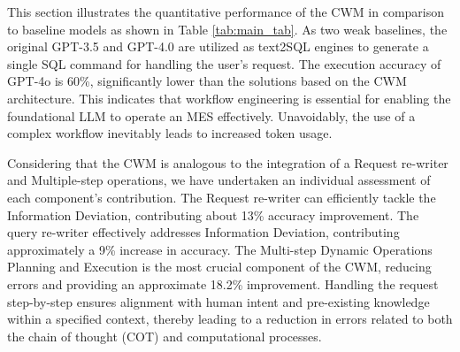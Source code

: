 \documentclass[preprint,12pt]{elsarticle}
\begin{document}
This section illustrates the quantitative performance of the CWM in comparison to baseline models as shown in Table \ref{tab:main_tab}.%
As two weak baselines, the original GPT-3.5 and GPT-4.0 are utilized as text2SQL engines to generate a single SQL command for handling the user's request.
The execution accuracy of GPT-4o is 60\%, significantly lower than the solutions based on the CWM architecture. 
This indicates that workflow engineering is essential for enabling the foundational LLM to operate an MES effectively.
Unavoidably, the use of a complex workflow inevitably leads to increased token usage.

Considering that the CWM is analogous to the integration of a Request re-writer and Multiple-step operations, we have undertaken an individual assessment of each component's contribution.
The Request re-writer can efficiently tackle the Information Deviation, contributing about 13\% accuracy improvement.
The query re-writer effectively addresses Information Deviation, contributing approximately a 9\% increase in accuracy. 
The Multi-step Dynamic Operations Planning and Execution is the most crucial component of the CWM, reducing errors and providing an approximate 18.2\% improvement. 
Handling the request step-by-step ensures alignment with human intent and pre-existing knowledge within a specified context, thereby leading to a reduction in errors related to both the chain of thought (COT) and computational processes.
\end{document}
